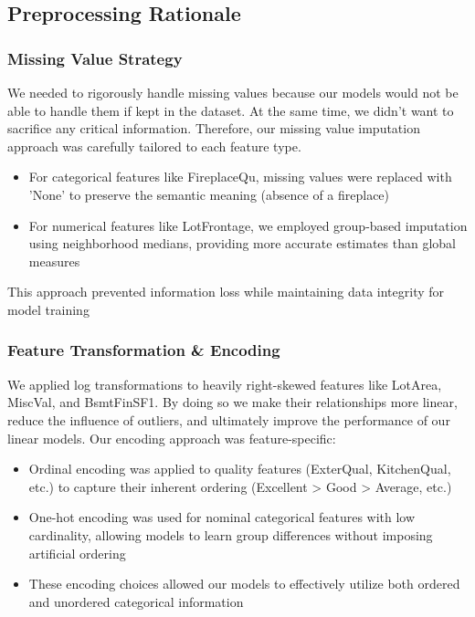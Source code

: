 \documentclass{article}
\begin{document}
\subsection{Preprocessing Rationale}

\subsubsection{Missing Value Strategy}
We needed to rigorously handle missing values because our models would not be able to handle them if kept in the dataset. At the same time, we didn't want to sacrifice any critical information. Therefore, our missing value imputation approach was carefully tailored to each feature type.
\begin{itemize}
    \item For categorical features like FireplaceQu, missing values were replaced with 'None' to preserve the semantic meaning (absence of a fireplace)
    \item For numerical features like LotFrontage, we employed group-based imputation using neighborhood medians, providing more accurate estimates than global measures
\end{itemize}
This approach prevented information loss while maintaining data integrity for model training

\subsubsection{Feature Transformation \& Encoding}
We applied log transformations to heavily right-skewed features like LotArea, MiscVal, and BsmtFinSF1. By doing so we make their relationships more linear, reduce the influence of outliers, and ultimately improve the performance of our linear models.
Our encoding approach was feature-specific:
\begin{itemize}
    \item Ordinal encoding was applied to quality features (ExterQual, KitchenQual, etc.) to capture their inherent ordering (Excellent > Good > Average, etc.)
    \item One-hot encoding was used for nominal categorical features with low cardinality, allowing models to learn group differences without imposing artificial ordering
    \item These encoding choices allowed our models to effectively utilize both ordered and unordered categorical information
\end{itemize}
\end{document}
